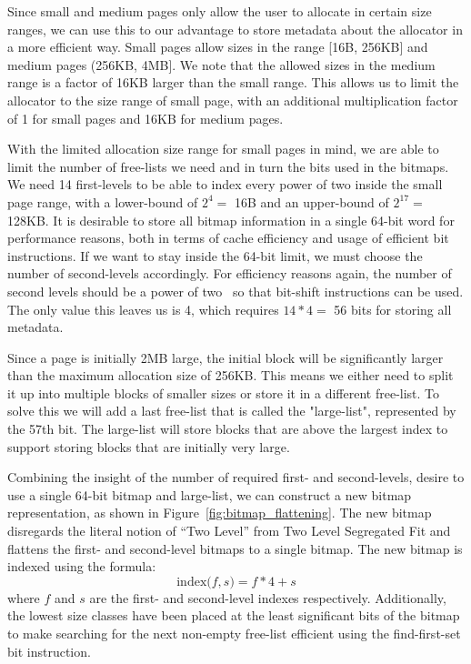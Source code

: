 Since small and medium pages only allow the user to allocate in certain size ranges, we can use this to our advantage to store metadata about the allocator in a more efficient way. Small pages allow sizes in the range [16B, 256KB] and medium pages (256KB, 4MB]. We note that the allowed sizes in the medium range is a factor of 16KB larger than the small range. This allows us to limit the allocator to the size range of small page, with an additional multiplication factor of 1 for small pages and 16KB for medium pages.

With the limited allocation size range for small pages in mind, we are able to limit the number of free-lists we need and in turn the bits used in the bitmaps. We need 14 first-levels to be able to index every power of two inside the small page range, with a lower-bound of $2^4 =$ 16B and an upper-bound of $2^{17} =$ 128KB. It is desirable to store all bitmap information in a single 64-bit word for performance reasons, both in terms of cache efficiency and usage of efficient bit instructions. If we want to stay inside the 64-bit limit, we must choose the number of second-levels accordingly. For efficiency reasons again, the number of second levels should be a power of two~\cite{TLSF} so that bit-shift instructions can be used. The only value this leaves us is 4, which requires $14 * 4 =$ 56 bits for storing all metadata.

Since a page is initially 2MB large, the initial block will be significantly larger than the maximum allocation size of 256KB. This means we either need to split it up into multiple blocks of smaller sizes or store it in a different free-list. To solve this we will add a last free-list that is called the "large-list", represented by the 57th bit. The large-list will store blocks that are above the largest index to support storing blocks that are initially very large.

Combining the insight of the number of required first- and second-levels, desire to use a single 64-bit bitmap and large-list, we can construct a new bitmap representation, as shown in Figure~\ref{fig:bitmap_flattening}. The new bitmap disregards the literal notion of ``Two Level'' from Two Level Segregated Fit and flattens the first- and second-level bitmaps to a single bitmap. The new bitmap is indexed using the formula: 
\[
    \text{index($f, s$)} = f * 4 + s
\]
where $f$ and $s$ are the first- and second-level indexes respectively. Additionally, the lowest size classes have been placed at the least significant bits of the bitmap to make searching for the next non-empty free-list efficient using the find-first-set bit instruction.

